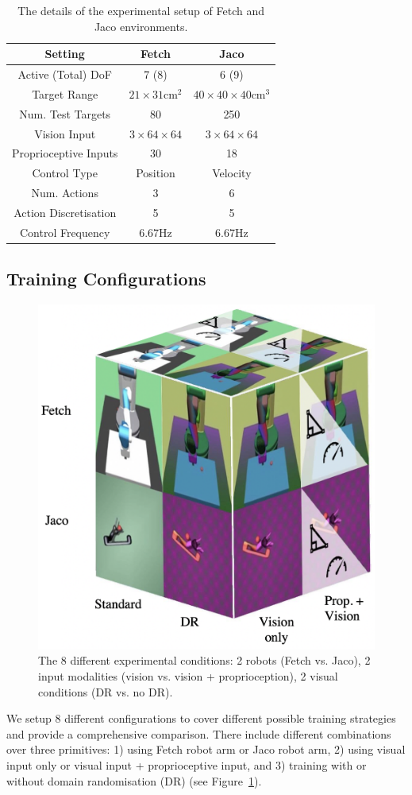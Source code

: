 \begin{table}[h!]
  \centering
  \begin{tabular}{c|cc}
    \toprule
    Setting & Fetch & Jaco \\
    \midrule
    Active (Total) DoF & 7 (8) & 6 (9) \\
    Target Range & $21 \times 31 \text{cm}^2$ & $40 \times 40 \times 40 \text{cm}^3$ \\
    Num. Test Targets & 80 & 250 \\
    Vision Input & $3 \times 64 \times 64$ & $3 \times 64 \times 64$ \\
    Proprioceptive Inputs & 30 & 18 \\
    Control Type & Position & Velocity \\
    Num. Actions & 3 & 6 \\
    Action Discretisation & 5 & 5 \\
    Control Frequency & 6.67Hz & 6.67Hz \\
    \bottomrule
  \end{tabular}
  \caption{The details of the experimental setup of Fetch and Jaco environments.}
  \label{tbl:exp_setup}
\end{table}

\subsection{Training Configurations}
\begin{figure}[h!]
  \centering
  \includegraphics[width=0.85\linewidth]{figures/chapter6/axes.png}
  \caption{The 8 different experimental conditions: 2 robots (Fetch vs. Jaco), 2 input modalities (vision vs. vision + proprioception), 2 visual conditions (DR vs. no DR).}
  \label{fig:axes}
\end{figure}
We setup 8 different configurations to cover different possible training strategies and provide a comprehensive comparison. There include different combinations over three primitives: 1) using Fetch robot arm or Jaco robot arm, 2) using visual input only or visual input + proprioceptive input, and 3) training with or without domain randomisation (DR) (see Figure~\ref{fig:axes}).

